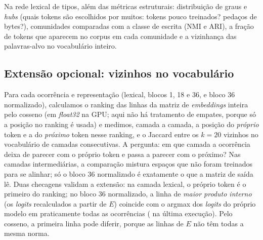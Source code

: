 Na rede lexical de tipos, além das métricas estruturais: distribuição de graus e \emph{hubs}
(quais tokens são escolhidos por muitos: tokens pouco treinados? pedaços de bytes?),
comunidades comparadas com a classe de escrita (NMI e ARI), a fração de tokens que aparecem no
corpus em cada comunidade e a vizinhança das palavras-alvo no vocabulário inteiro.

\subsection{Extensão opcional: vizinhos no vocabulário}\label{sec:met-lente}

Para cada ocorrência e representação (lexical, blocos 1, 18 e 36, e bloco 36 normalizado),
calculamos o ranking das linhas da matriz de \emph{embeddings} inteira pelo cosseno (em
\emph{float32} na GPU; aqui não há tratamento de empates, porque só a posição no ranking é
usada) e medimos, camada a camada, a posição do \emph{próprio} token e a do \emph{próximo}
token nesse ranking, e o Jaccard entre os $k=20$ vizinhos no vocabulário de camadas
consecutivas. A pergunta: em que camada a ocorrência deixa de parecer com o próprio token e
passa a parecer com o próximo? Nas camadas intermediárias, a comparação mistura espaços que não
foram treinados para se alinhar; só o bloco 36 normalizado é exatamente o que a matriz de saída
lê. Duas checagens validam a extensão: na camada lexical, o próprio token é o primeiro do
ranking; no bloco 36 normalizado, a linha de \emph{maior produto interno} (os \emph{logits}
recalculados a partir de $E$) coincide com o argmax dos \emph{logits} do próprio modelo em
praticamente todas as ocorrências (\concordanciaPredicao{} na última execução). Pelo cosseno, a
primeira linha pode diferir, porque as linhas de $E$ não têm todas a mesma norma.

